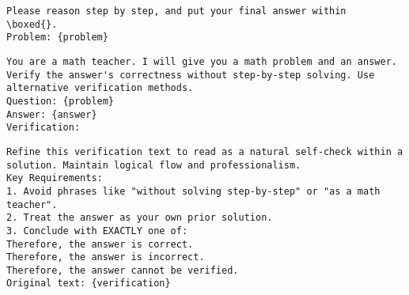 \begin{lstlisting}[title={Sampling Responses During Training/Inference}]
Please reason step by step, and put your final answer within 
\boxed{}. 
Problem: {problem} 
\end{lstlisting}

\begin{lstlisting}[title={Verification Refinement}]
You are a math teacher. I will give you a math problem and an answer. 
Verify the answer's correctness without step-by-step solving. Use alternative verification methods. 
Question: {problem}
Answer: {answer}
Verification:
\end{lstlisting}

\begin{lstlisting}[title={Verification Collection}]
Refine this verification text to read as a natural self-check within a solution. Maintain logical flow and professionalism.
Key Requirements:
1. Avoid phrases like "without solving step-by-step" or "as a math teacher".
2. Treat the answer as your own prior solution.
3. Conclude with EXACTLY one of:
Therefore, the answer is correct.
Therefore, the answer is incorrect.
Therefore, the answer cannot be verified.
Original text: {verification}
\end{lstlisting}
